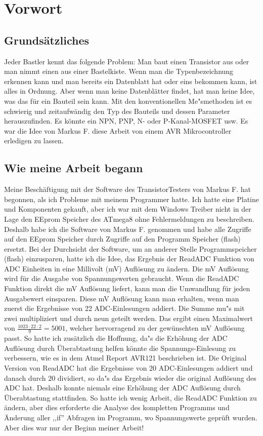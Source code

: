 \section*{Vorwort}

\subsection*{Grunds\"atzliches}
Jeder Bastler kennt das folgende Problem: Man baut einen Transistor aus oder man nimmt einen aus einer Bastelkiste.
Wenn man die Typenbezeichnung erkennen kann und man bereits ein Datenblatt hat oder eins bekommen kann, ist alles in Ordnung.
Aber wenn man keine Datenbl\"atter findet, hat man keine Idee, was das f\"ur ein Bauteil sein kann.
Mit den konventionellen Me"smethoden ist es schwierig und zeitaufw\"andig den Typ des Bauteils und dessen Parameter herauszufinden.
Es k\"onnte ein NPN, PNP, N- oder P-Kanal-MOSFET usw.
Es war die Idee von Markus F. diese Arbeit von einem AVR Mikrocontroller erledigen zu lassen.

\subsection*{Wie meine Arbeit begann}
Meine Besch\"aftigung mit der Software des TransistorTesters von Markus F. \cite{Frejek} hat begonnen, als ich Probleme mit
meinem Programmer hatte.
Ich hatte eine Platine und Komponenten gekauft, aber ich war mit dem Windows Treiber nicht in der Lage den EEprom Speicher des ATmega8
ohne Fehlermeldungen zu beschreiben.
Deshalb habe ich die Software von Markus F. genommen und habe alle Zugriffe auf den EEprom Speicher durch
Zugriffe auf den Programm Speicher (flash) ersetzt.
Bei der Durchsicht der Software, um an anderer Stelle Programmspeicher (flash) einzusparen, hatte ich die Idee,
das Ergebnis der ReadADC Funktion von ADC Einheiten in eine Millivolt (mV) Aufl\"osung zu \"andern.
Die mV Aufl\"osung wird f\"ur die Ausgabe von Spannungswerten gebraucht.
Wenn die ReadADC Funktion direkt die mV Aufl\"osung liefert, kann man die Umwandlung f\"ur jeden
Ausgabewert einsparen.
Diese mV Aufl\"osung kann man erhalten, wenn man zuerst die Ergebnisse von 22 ADC-Einlesungen addiert.
Die Summe mu"s mit zwei multipliziert und durch neun geteilt werden.
Das ergibt einen Maximalwert von \begin{math}\frac{1023\cdot22\cdot2}{9} = 5001\end{math},
welcher hervorragend zu der gew\"unschten mV Aufl\"osung passt.
So hatte ich zus\"atzlich die Hoffnung, da"s die Erh\"ohung der ADC Aufl\"osung durch \"Uberabtastung helfen
k\"onnte die Spannungs-Einlesung zu verbessern, wie es in dem Atmel Report AVR121 \cite{AVR121} beschrieben ist.
Die Original Version von ReadADC hat die Ergebnisse von 20 ADC-Einlesungen addiert und danach durch 20 dividiert,
so da"s das Ergebnis wieder die original Aufl\"osung des ADC hat. Deshalb konnte niemals eine Erh\"ohung der ADC Aufl\"osung
durch \"Uberabtastung stattfinden.
So hatte ich wenig Arbeit, die ReadADC Funktion zu \"andern, aber dies erforderte die Analyse des kompletten
Programms und \"Anderung aller ,,if'' Abfragen im Programm, wo Spannungswerte gepr\"uft wurden.
Aber dies war nur der Beginn meiner Arbeit!

